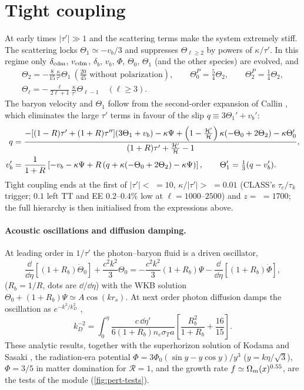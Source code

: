 \section{Tight coupling}\label{sec:pert-tc}

At early times $|\tau'|\gg1$ and the scattering terms make the system extremely stiff. The scattering locks
$\Theta_1\simeq-v_b/3$ and suppresses $\Theta_{\ell\ge2}$ by powers of $\kappa/\tau'$. In this regime only
$\delta_{\rm cdm}$, $v_{\rm cdm}$, $\delta_b$, $v_b$, $\Phi$, $\Theta_0$, $\Theta_1$ (and the other species) are evolved, and
\begin{gather}
\Theta_2=-\frac{8}{15}\frac{\kappa}{\tau'}\Theta_1\ \left(\tfrac{20}{45}\text{ without polarization}\right),\qquad
\Theta^P_0=\tfrac54\Theta_2,\qquad \Theta^P_2=\tfrac14\Theta_2,\\
\Theta_\ell=-\frac{\ell}{2\ell+1}\frac\kappa{\tau'}\Theta_{\ell-1}\quad(\ell\ge3).
\end{gather}
The baryon velocity and $\Theta_1$ follow from the second-order expansion of Callin \cite{Callin2006}, which
eliminates the large $\tau'$ terms in favour of the slip $q\equiv3\Theta_1'+v_b'$:
\begin{align}
q&=\frac{-[(1-R)\tau'+(1+R)\tau''](3\Theta_1+v_b)-\kappa\Psi+\left(1-\frac{\mathcal{H}'}{\mathcal{H}}\right)\kappa(-\Theta_0+2\Theta_2)
-\kappa\Theta_0'}{(1+R)\tau'+\frac{\mathcal{H}'}{\mathcal{H}}-1},\\
v_b'&=\frac{1}{1+R}\left[-v_b-\kappa\Psi+R\left(q+\kappa(-\Theta_0+2\Theta_2)-\kappa\Psi\right)\right],\qquad
\Theta_1'=\tfrac13(q-v_b').
\end{align}
Tight coupling ends at the first of $|\tau'|<$  $=10$, $\kappa/|\tau'|>$ 
$=0.01$ (CLASS's $\tau_c/\tau_k$ trigger; $0.1$ left TT and EE $0.2$--$0.4\%$ low at $\ell=1000$--$2500$) and
$z=$  $=1700$; the full hierarchy is then initialised from the expressions above.

\paragraph*{Acoustic oscillations and diffusion damping.} At leading order in $1/\tau'$ the photon--baryon fluid is a
driven oscillator,
\begin{equation}
\frac{\dd}{\dd\eta}\left[(1+R_b)\dot\Theta_0\right]+\frac{c^2k^2}{3}\Theta_0=-\frac{c^2k^2}{3}(1+R_b)\Psi
-\frac{\dd}{\dd\eta}\left[(1+R_b)\dot\Phi\right],
\end{equation}
($R_b=1/R$, dots are $\dd/\dd\eta$) with the WKB solution $\Theta_0+(1+R_b)\Psi\simeq A\cos(kr_s)$. At next order
photon diffusion damps the oscillation as $e^{-k^2/k_D^2}$ \cite{HuSugiyama1995},
\begin{equation}
k_D^{-2}=\int_0^\eta\frac{c\,\dd\eta'}{6(1+R_b)n_e\sigma_Ta}\left[\frac{R_b^2}{1+R_b}+\frac{16}{15}\right].
\end{equation}
These analytic results, together with the superhorizon solution of Kodama and Sasaki \cite{Kodama1984}, the
radiation-era potential $\Phi=3\Phi_0(\sin y-y\cos y)/y^3$ ($y=k\eta/\sqrt3$), $\Phi=3/5$ in matter domination for
$\mathcal R=1$, and the growth rate $f\simeq\Omega_m(x)^{0.55}$, are the tests of the module (\cref{fig:pert-tests}).


